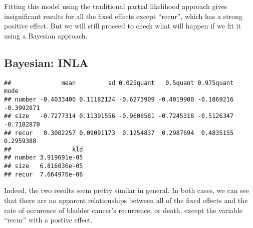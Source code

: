 \documentclass[]{article}
\newenvironment{Shaded}{\begin{snugshade}}{\end{snugshade}}
\newcommand{\DataTypeTok}[1]{\textcolor[rgb]{0.13,0.29,0.53}{#1}}
\newcommand{\DecValTok}[1]{\textcolor[rgb]{0.00,0.00,0.81}{#1}}
\newcommand{\KeywordTok}[1]{\textcolor[rgb]{0.13,0.29,0.53}{\textbf{#1}}}
\newcommand{\NormalTok}[1]{#1}
\newcommand{\OperatorTok}[1]{\textcolor[rgb]{0.81,0.36,0.00}{\textbf{#1}}}
\newcommand{\OtherTok}[1]{\textcolor[rgb]{0.56,0.35,0.01}{#1}}
\newcommand{\StringTok}[1]{\textcolor[rgb]{0.31,0.60,0.02}{#1}}
\begin{document}
Fitting this model using the traditional partial likelihood approach
gives insignificant results for all the fixed effects except ``recur'',
which has a strong positive effect. But we will still proceed to check
what will happen if we fit it using a Bayesian approach.

\hypertarget{bayesian-inla-1}{%
\subsection{Bayesian: INLA}\label{bayesian-inla-1}}

\begin{Shaded}
\end{Shaded}

\begin{verbatim}
##              mean         sd 0.025quant   0.5quant 0.975quant       mode
## number -0.4033400 0.11182124 -0.6273909 -0.4019900 -0.1869216 -0.3992871
## size   -0.7277314 0.11391556 -0.9608581 -0.7245318 -0.5126347 -0.7182870
## recur   0.3002257 0.09091173  0.1254837  0.2987694  0.4835155  0.2959388
##                 kld
## number 3.919691e-05
## size   6.816036e-05
## recur  7.664976e-06
\end{verbatim}

Indeed, the two results seem pretty similar in general. In both cases,
we can see that there are no apparent relationships between all of the
fixed effects and the rate of occurence of bladder cancer's recurrence,
or death, except the variable ``recur'' with a postive effect.
\end{document}
